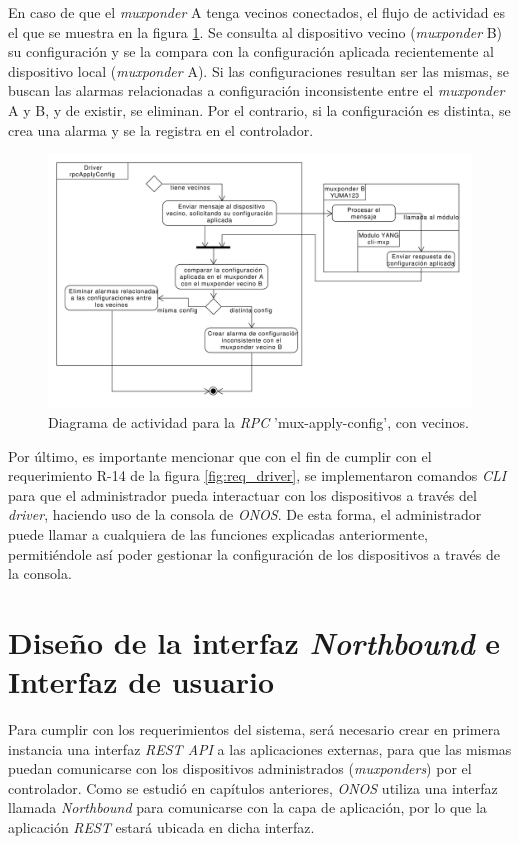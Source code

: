   En caso de que el \textit{muxponder} A tenga vecinos conectados, el flujo de actividad es el que se muestra en la figura \ref{fig:actividad_driver_rpc_con_vecinos}. Se consulta al dispositivo vecino (\textit{muxponder} B) su configuración y se la compara con la configuración aplicada recientemente al dispositivo local (\textit{muxponder} A). Si las configuraciones resultan ser las mismas, se buscan las alarmas relacionadas a configuración inconsistente entre el \textit{muxponder} A y B, y de existir, se eliminan. Por el contrario, si la configuración es distinta, se crea una alarma y se la registra en el controlador.

  \begin{figure}[H]
    \centering
    \includegraphics[scale=0.44]{Figures/actividad_driver_rpc_con_vecinos.pdf}
    \caption{Diagrama de actividad para la \textit{RPC} 'mux-apply-config', con vecinos.}
    \label{fig:actividad_driver_rpc_con_vecinos}
  \end{figure}


  Por último, es importante mencionar que con el fin de cumplir con el requerimiento R-14 de la figura \ref{fig:req_driver}, se implementaron comandos \textit{CLI} para que el administrador pueda interactuar con los dispositivos a través del \textit{driver}, haciendo uso de la consola de \textit{ONOS}. De esta forma, el administrador puede llamar a cualquiera de las funciones explicadas anteriormente, permitiéndole así poder gestionar la configuración de los dispositivos a través de la consola.

  \section{Diseño de la interfaz \textit{Northbound} e Interfaz de usuario}
  Para cumplir con los requerimientos del sistema, será necesario crear en primera instancia una interfaz \textit{REST API} a las aplicaciones externas, para que las mismas puedan comunicarse con los dispositivos administrados (\textit{muxponders}) por el controlador. Como se estudió en capítulos anteriores, \textit{ONOS} utiliza una interfaz llamada \textit{Northbound} para comunicarse con la capa de aplicación, por lo que la aplicación \textit{REST} estará ubicada en dicha interfaz. 

